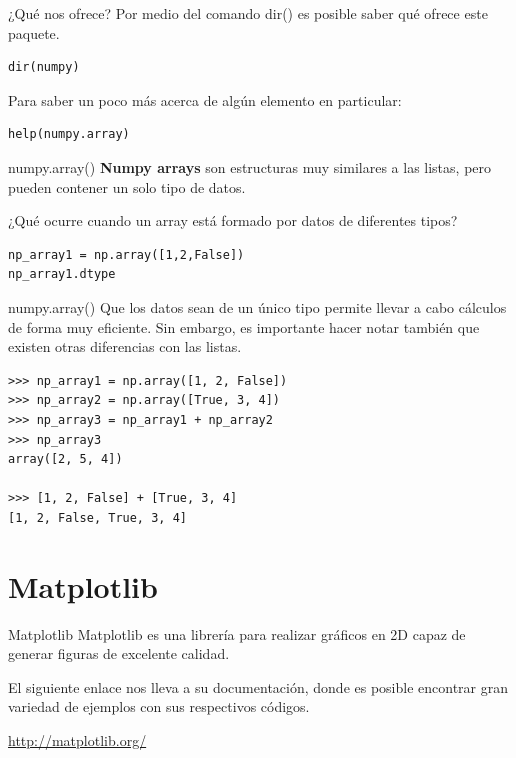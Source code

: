 \documentclass[10pt]{beamer}
\begin{document}
\begin{frame}[fragile]{¿Qué nos ofrece?}
Por medio del comando \alert{dir()} es posible saber qué ofrece este paquete.
\begin{verbatim}
dir(numpy) 
\end{verbatim}
Para saber un poco más acerca de algún elemento en particular:
\begin{verbatim}
help(numpy.array)
\end{verbatim}
\end{frame}

\begin{frame}[fragile]{numpy.array()}
	\textbf{Numpy arrays} son estructuras muy similares a las listas, pero pueden contener un solo tipo de datos.
	\begin{center}
		¿Qué ocurre cuando un array está formado por datos de diferentes tipos?
	\end{center}
	\begin{verbatim}
np_array1 = np.array([1,2,False])
np_array1.dtype 
	\end{verbatim}
	
\end{frame}

\begin{frame}[fragile]{numpy.array()}
	Que los datos sean de un único tipo permite llevar a cabo cálculos de forma muy eficiente. Sin embargo, es importante hacer notar también que existen otras diferencias con las listas. 
	
	\begin{verbatim}
>>> np_array1 = np.array([1, 2, False])
>>> np_array2 = np.array([True, 3, 4])
>>> np_array3 = np_array1 + np_array2
>>> np_array3
array([2, 5, 4])

>>> [1, 2, False] + [True, 3, 4]
[1, 2, False, True, 3, 4]
	\end{verbatim}
\end{frame}

\section{Matplotlib}
\begin{frame}{Matplotlib}
	Matplotlib es una librería para realizar gráficos en 2D capaz de generar figuras de excelente calidad.
	
	El siguiente enlace nos lleva a su documentación, donde es posible encontrar gran variedad de ejemplos con sus respectivos códigos.
	
	\begin{center}
		\url{http://matplotlib.org/}
	\end{center}  
\end{frame}
\end{document}
